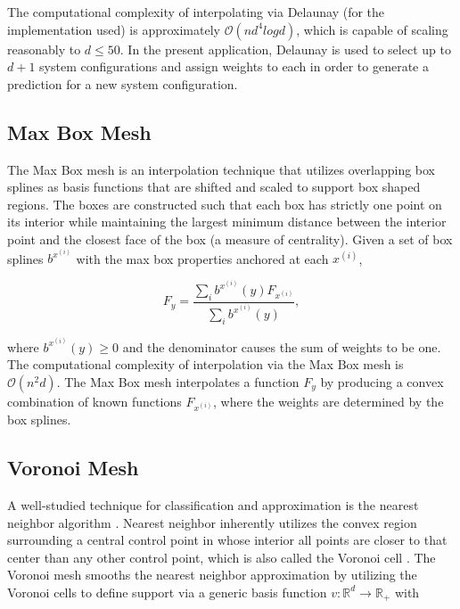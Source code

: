 \documentclass[letterpaper, 10 pt, conference]{ieeeconf}  %
\begin{document}
The computational complexity of interpolating via Delaunay (for the implementation used) is approximately $\mathcal{O}(n d^4 log d)$, which is capable of scaling reasonably to $d \leq 50$. In the present application, Delaunay is used to select up to $d+1$ system configurations and assign weights to each in order to generate a prediction for a new system configuration.

\subsection{Max Box Mesh}
\label{sec:max_box_mesh}

The Max Box mesh is an interpolation technique that utilizes overlapping box splines \cite{de2013box} as basis functions that are shifted and scaled to support box shaped regions. The boxes are constructed such that each box has strictly one point on its interior while maintaining the largest minimum distance between the interior point and the closest face of the box (a measure of centrality). Given a set of box splines $b^{x^{(i)}}$ with the max box properties anchored at each $x^{(i)}$,

$$ F_y = \frac{\sum_i b^{x^{(i)}}(y) F_{x^{(i)}}}{\sum_i b^{x^{(i)}}(y)}, $$

where $b^{x^{(i)}}(y) \geq 0$ and the denominator causes the sum of weights to be one. The computational complexity of interpolation via the Max Box mesh is $\mathcal{O}(n^2 d)$. The Max Box mesh interpolates a function $F_y$ by producing a convex combination of known functions $F_{x^{(i)}}$, where the weights are determined by the box splines.

\subsection{Voronoi Mesh}
\label{sec:voronoi_mesh}

A well-studied technique for classification and approximation is the nearest neighbor algorithm \cite{cover1967nearest}. Nearest neighbor inherently utilizes the convex region surrounding a central control point in whose interior all points are closer to that center than any other control point, which is also called the Voronoi cell \cite{dirichlet1850reduction}. The Voronoi mesh smooths the nearest neighbor approximation by utilizing the Voronoi cells to define support via a generic basis function $v: \mathbb{R}^d \rightarrow \mathbb{R}_+$ with
\end{document}
